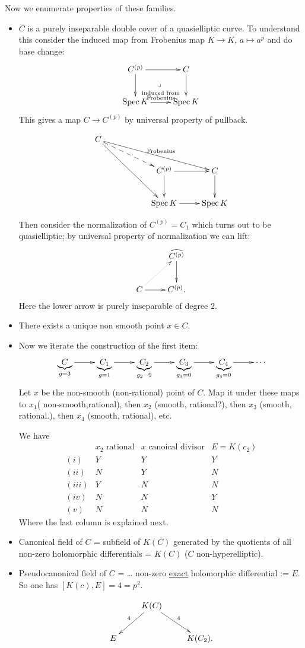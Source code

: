 \noindent
Now we enumerate properties of these
families.

\begin{itemize}
\item $C$ is a purely inseparable double
cover of a quasielliptic curve.
To understand this consider the induced map
from
Frobenius map $K \to K$, $a \mapsto a^p$ and
do base change:
$$
\xymatrix{
C^{(p)}\ar[r]\ar[d]\ar@{}[dr]|-{\lrcorner}&
C\ar[d]\\
\Spec K\ar[r]^{\substack{\text{induced from}
\\ \text{Frobenius}}}&\Spec K
}
$$
This gives a map $C \to C^{(p)}$ by universal
property of pullback.

$$
\xymatrix{
C \ar[rrrd]^{\text{Frobenius}}
\ar@{-->}[rrd]\ar[rrdd] & & \\
& &  C^{(p)}\ar[d] \ar[r] & C \ar[d] \\
& &  \Spec K\ar[r] & \Spec K
}
$$

Then consider the normalization of
$C^{(p)}=C_1$ which
turns out to be quasielliptic; by universal
property of normalization we can lift:
$$
\xymatrix{
& \widehat{C^{(p)}}\ar[d]\\
C\ar@{.>}[ur]\ar[r]&C^{(p)}.
}
$$
Here the lower arrow is purely inseparable of
degree 2.

\item There exists a unique non smooth point
$x \in C$.

\item Now we iterate the construction of the
first item:
$$
\xymatrix{
\underbrace{C}_{g=3}\ar[r]&\underbrace{C_1}
_{g=1}\ar[r]&
\underbrace{C_2}_{g_2-9}\ar[r]&
\underbrace{C_3}_{g_3=0}\ar[r]&
\underbrace{C_4}_{g_4=0}\ar[r]&\cdots
}
$$
Let $x$ be the non-smooth (non-rational)
point of $C$. Map it under
these maps to $x_1$( non-smooth,rational),
then  $x_2$ (smooth, rational?),
then $x_3 $ (smooth, rational.), then $x_4$
(smooth, rational), etc.

We have
$$
\begin{matrix}
&\text{$x_2$ rational}& \text{$x$ canoical
divisor} &
E=K(c_2)\\
(i)& Y & Y & Y\\
(ii) & N & Y & N\\
(iii) & Y & N & N\\
(iv) & N & N & Y\\
(v) & N & N & N
\end{matrix}
$$
Where the last column is explained next.

\item Canonical field of $C$ = subfield of
$K(C)$ generated
by the quotients of all non-zero holomorphic
differentials
=  $K(C)$ ($C$ non-hyperelliptic).

\item Pseudocanonical field of $C$ = …
non-zero \underline{exact}
holomorphic differential := $E$. So one has
$[K(c),E]=4=p^2$.

$$
\xymatrix{
&K(C)\ar[ld]_{4}\ar[rd]^{4}\\
E&&K(C_2).
}
$$
\end{itemize}

